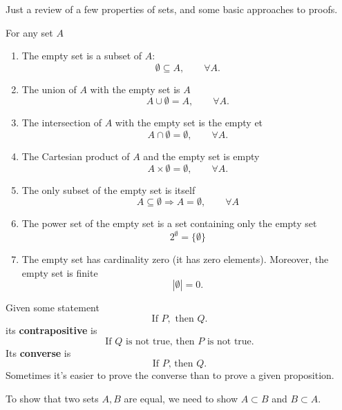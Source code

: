 
Just a review of a few properties of sets, and some basic
approaches to proofs.

\begin{prop}\label{prop:emptySets}
  For any set $A$
\begin{enumerate}
\item The empty set is a subset of $A$:
\begin{equation*}
  \emptyset\subseteq A,\qquad\forall A.
\end{equation*}
\item The union of $A$ with the empty set is $A$
\begin{equation*}
  A\cup\emptyset=A,\qquad\forall A.
\end{equation*}
\item The intersection of $A$ with the empty set is the empty et
\begin{equation*}%
  A\cap\emptyset=\emptyset,\qquad\forall A.
\end{equation*}
\item The Cartesian product of $A$ and the empty set is empty
\begin{equation*}%
  A\times\emptyset=\emptyset,\qquad\forall A.
\end{equation*}
\item The only subset of the empty set is itself
\begin{equation*}%
  A\subseteq\emptyset\Rightarrow A=\emptyset,\qquad\forall A
\end{equation*}
\item The power set of the empty set is a set containing only the
  empty set
\begin{equation*}%
  2^{\emptyset}=\{\emptyset\}
\end{equation*}
\item The empty set has cardinality zero (it has zero
  elements). Moreover, the empty set is finite
\begin{equation*}%
  |\emptyset|=0.
\end{equation*}
\end{enumerate}
\end{prop}

Given some statement
\begin{equation}%
\text{If }P,\text{ then }Q.
\end{equation}
its \textbf{contrapositive} is 
\begin{equation}%
\text{If }Q\text{ is not true, then }P\text{ is not true.} 
\end{equation}
Its \textbf{converse} is 
\begin{equation}%
\text{If }P\text{, then }Q.
\end{equation}
Sometimes it's easier to prove the converse than to prove a given
proposition.

To show that two sets $A, B$ are equal, we need to show $A\subset
B$ and $B\subset A$.
